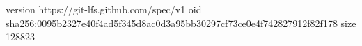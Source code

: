 version https://git-lfs.github.com/spec/v1
oid sha256:0095b2327e40f4ad5f345d8ac0d3a95bb30297cf73ce0e4f742827912f82f178
size 128823
